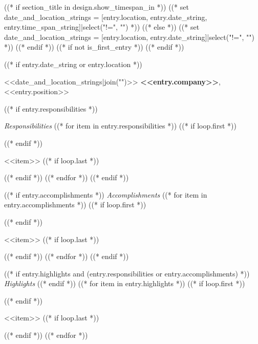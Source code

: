 ((* if section_title in design.show_timespan_in *))
    ((* set date_and_location_strings = [entry.location, entry.date_string, entry.time_span_string]|select("!=", "") *))
((* else *))
    ((* set date_and_location_strings = [entry.location, entry.date_string]|select("!=", "") *))
((* endif *))
((* if not is_first_entry *))
\vspace{<<design.margins.entry_area.vertical_between>>}
((* endif *))

((* if entry.date_string or entry.location *))
\begin{twocolentry}{
    <<date_and_location_strings|join("\n\n")>>
}
\textbf{<<entry.company>>}, <<entry.position>>

((* if entry.responsibilities *))

    \textit{\newline Responsibilities}
    ((* for item in entry.responsibilities *))
        ((* if loop.first *))
    \begin{highlights}
        ((* endif *))
        \item <<item>>
        ((* if loop.last *))
    \end{highlights}
        ((* endif *))
    ((* endfor *))
((* endif *))

((* if entry.accomplishments *))
    \textit{Accomplishments}
    ((* for item in entry.accomplishments *))
        ((* if loop.first *))
    \begin{highlights}
        ((* endif *))
        \item <<item>>
        ((* if loop.last *))
    \end{highlights}
        ((* endif *))
    ((* endfor *))
((* endif *))

((* if entry.highlights and (entry.responsibilities or entry.accomplishments) *))
\textit{Highlights}
((* endif *))
((* for item in entry.highlights *))
    ((* if loop.first *))
\begin{highlights}
    ((* endif *))
    \item <<item>>
    ((* if loop.last *))
\end{highlights}
    ((* endif *))
((* endfor *))
\end{twocolentry}


